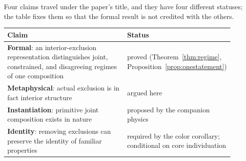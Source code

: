 \documentclass[11pt]{article}
\begin{document}
\noindent Four claims travel under the paper's title, and they have four different statuses; the table fixes them so that the formal result is not credited with the others.
\begin{center}
\begin{tabular}{p{0.66\linewidth} p{0.26\linewidth}}
\toprule
\textbf{Claim} & \textbf{Status} \\
\midrule
\textbf{Formal}: an interior-exclusion representation distinguishes joint, constrained, and disagreeing regimes of one composition & proved (Theorem~\ref{thm:regime}, Proposition~\ref{prop:onestatement}) \\
\textbf{Metaphysical}: actual exclusion is in fact interior structure & argued here \\
\textbf{Instantiation}: primitive joint composition exists in nature & proposed by the companion physics \\
\textbf{Identity}: removing exclusions can preserve the identity of familiar properties & required by the color corollary; conditional on core individuation \\
\bottomrule
\end{tabular}
\end{center}
\end{document}
